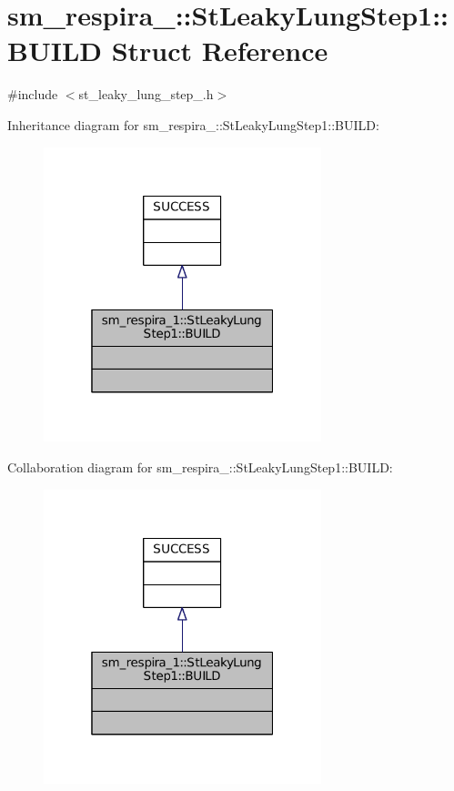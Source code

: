 \hypertarget{structsm__respira__1_1_1StLeakyLungStep1_1_1BUILD}{}\section{sm\+\_\+respira\+\_\+:\+:St\+Leaky\+Lung\+Step1\+:\+:B\+U\+I\+LD Struct Reference}
\label{structsm__respira__1_1_1StLeakyLungStep1_1_1BUILD}


{\ttfamily \#include $<$st\+\_\+leaky\+\_\+lung\+\_\+step\+\_.\+h$>$}



Inheritance diagram for sm\+\_\+respira\+\_\+:\+:St\+Leaky\+Lung\+Step1\+:\+:B\+U\+I\+LD\+:
\nopagebreak
\begin{figure}[H]
\begin{center}
\leavevmode
\includegraphics[width=229pt]{structsm__respira__1_1_1StLeakyLungStep1_1_1BUILD__inherit__graph}
\end{center}
\end{figure}


Collaboration diagram for sm\+\_\+respira\+\_\+:\+:St\+Leaky\+Lung\+Step1\+:\+:B\+U\+I\+LD\+:
\nopagebreak
\begin{figure}[H]
\begin{center}
\leavevmode
\includegraphics[width=229pt]{structsm__respira__1_1_1StLeakyLungStep1_1_1BUILD__coll__graph}
\end{center}
\end{figure}


